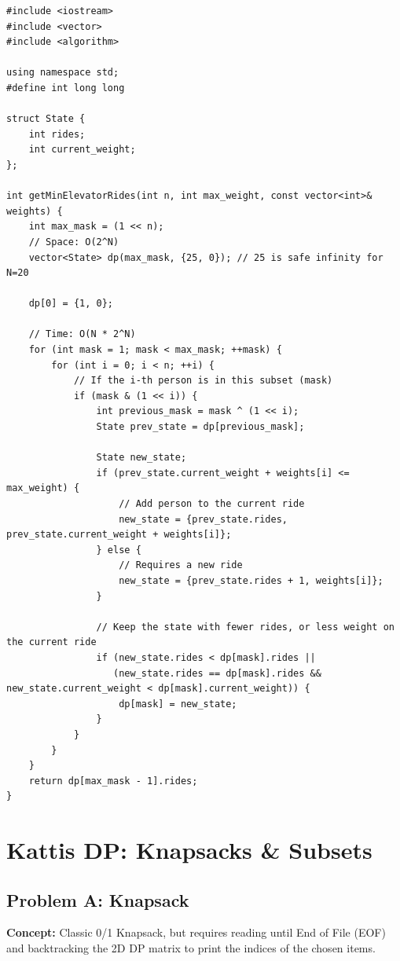 \begin{lstlisting}
#include <iostream>
#include <vector>
#include <algorithm>

using namespace std;
#define int long long

struct State {
    int rides;
    int current_weight;
};

int getMinElevatorRides(int n, int max_weight, const vector<int>& weights) {
    int max_mask = (1 << n);
    // Space: O(2^N)
    vector<State> dp(max_mask, {25, 0}); // 25 is safe infinity for N=20
    
    dp[0] = {1, 0};
    
    // Time: O(N * 2^N)
    for (int mask = 1; mask < max_mask; ++mask) {
        for (int i = 0; i < n; ++i) {
            // If the i-th person is in this subset (mask)
            if (mask & (1 << i)) {
                int previous_mask = mask ^ (1 << i);
                State prev_state = dp[previous_mask];
                
                State new_state;
                if (prev_state.current_weight + weights[i] <= max_weight) {
                    // Add person to the current ride
                    new_state = {prev_state.rides, prev_state.current_weight + weights[i]};
                } else {
                    // Requires a new ride
                    new_state = {prev_state.rides + 1, weights[i]};
                }
                
                // Keep the state with fewer rides, or less weight on the current ride
                if (new_state.rides < dp[mask].rides || 
                   (new_state.rides == dp[mask].rides && new_state.current_weight < dp[mask].current_weight)) {
                    dp[mask] = new_state;
                }
            }
        }
    }
    return dp[max_mask - 1].rides;
}
\end{lstlisting}



\section{Kattis DP: Knapsacks \& Subsets}

\subsection{Problem A: Knapsack}
\textbf{Concept:} Classic 0/1 Knapsack, but requires reading until End of File (EOF) and backtracking the 2D DP matrix to print the indices of the chosen items.

